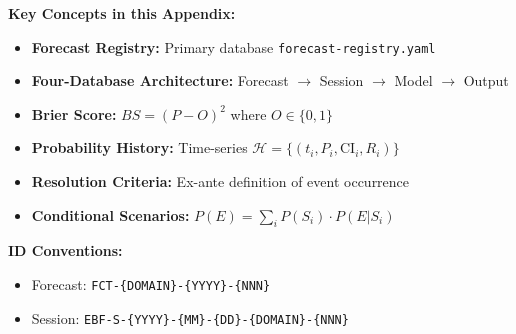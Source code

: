 \begin{abstract}
This appendix documents the EBF forecast methodology for systematic prediction tracking, probability updating, and calibration measurement. It covers political referenda, geopolitical events, economic forecasts, and behavioral predictions. The methodology emphasizes: (1) precise resolution criteria defined \textit{ex ante}, (2) probability history tracking for Bayesian updating, (3) conditional scenario analysis, and (4) post-hoc calibration via Brier scores and log loss. The framework integrates with the EBF 10C dimensions and context analysis ($\Psi$-framework) to ensure forecasts are grounded in behavioral economics principles.
\end{abstract}

\begin{tcolorbox}[colback=green!5!white,colframe=green!75!black,title=Quick Reference]
\textbf{Key Concepts in this Appendix:}
\begin{itemize}
    \item \textbf{Forecast Registry:} Primary database \texttt{forecast-registry.yaml}
    \item \textbf{Four-Database Architecture:} Forecast $\rightarrow$ Session $\rightarrow$ Model $\rightarrow$ Output
    \item \textbf{Brier Score:} $BS = (P - O)^2$ where $O \in \{0,1\}$
    \item \textbf{Probability History:} Time-series $\mathcal{H} = \{(t_i, P_i, \text{CI}_i, R_i)\}$
    \item \textbf{Resolution Criteria:} Ex-ante definition of event occurrence
    \item \textbf{Conditional Scenarios:} $P(E) = \sum_i P(S_i) \cdot P(E|S_i)$
\end{itemize}

\textbf{ID Conventions:}
\begin{itemize}
    \item Forecast: \texttt{FCT-\{DOMAIN\}-\{YYYY\}-\{NNN\}}
    \item Session: \texttt{EBF-S-\{YYYY\}-\{MM\}-\{DD\}-\{DOMAIN\}-\{NNN\}}
\end{itemize}
\end{tcolorbox}

